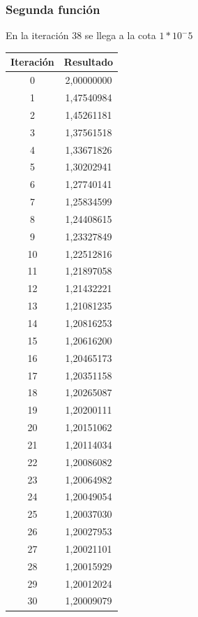 \documentclass[titlepage,a4paper]{article}
\begin{document}
\subsubsection{Segunda función}\label{sec:sec2}
En la iteración 38 se llega a la cota $1*10^-5$
\begin{center}
    \begin{tabular}{| c | c |}
    \hline
     Iteración & Resultado \\ \hline
        0     & 2,00000000 \\
        1     & 1,47540984 \\
        2     & 1,45261181 \\
        3     & 1,37561518 \\
        4     & 1,33671826 \\
        5     & 1,30202941 \\
        6     & 1,27740141 \\
        7     & 1,25834599 \\
        8     & 1,24408615 \\
        9     & 1,23327849 \\
        10    & 1,22512816 \\
        11    & 1,21897058 \\
        12    & 1,21432221 \\
        13    & 1,21081235 \\
        14    & 1,20816253 \\
        15    & 1,20616200 \\
        16    & 1,20465173 \\
        17    & 1,20351158 \\
        18    & 1,20265087 \\
        19    & 1,20200111 \\
        20    & 1,20151062 \\
        21    & 1,20114034 \\
        22    & 1,20086082 \\
        23    & 1,20064982 \\
        24    & 1,20049054 \\
        25    & 1,20037030 \\
        26    & 1,20027953 \\
        27    & 1,20021101 \\
        28    & 1,20015929 \\
        29    & 1,20012024 \\
        30    & 1,20009079 \\

\end{tabular}
\end{center}
\end{document}
